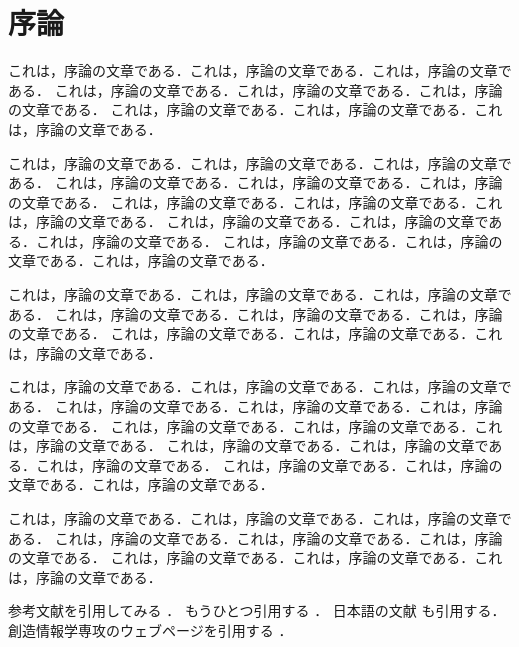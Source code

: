 \chapter{序論}

これは，序論の文章である．これは，序論の文章である．これは，序論の文章である．
これは，序論の文章である．これは，序論の文章である．これは，序論の文章である．
これは，序論の文章である．これは，序論の文章である．これは，序論の文章である．

これは，序論の文章である．これは，序論の文章である．これは，序論の文章である．
これは，序論の文章である．これは，序論の文章である．これは，序論の文章である．
これは，序論の文章である．これは，序論の文章である．これは，序論の文章である．
これは，序論の文章である．これは，序論の文章である．これは，序論の文章である．
これは，序論の文章である．これは，序論の文章である．これは，序論の文章である．

これは，序論の文章である．これは，序論の文章である．これは，序論の文章である．
これは，序論の文章である．これは，序論の文章である．これは，序論の文章である．
これは，序論の文章である．これは，序論の文章である．これは，序論の文章である．

これは，序論の文章である．これは，序論の文章である．これは，序論の文章である．
これは，序論の文章である．これは，序論の文章である．これは，序論の文章である．
これは，序論の文章である．これは，序論の文章である．これは，序論の文章である．
これは，序論の文章である．これは，序論の文章である．これは，序論の文章である．
これは，序論の文章である．これは，序論の文章である．これは，序論の文章である．

これは，序論の文章である．これは，序論の文章である．これは，序論の文章である．
これは，序論の文章である．これは，序論の文章である．これは，序論の文章である．
これは，序論の文章である．これは，序論の文章である．これは，序論の文章である．

参考文献を引用してみる \cite{92795,Knuth86}．
もうひとつ引用する \cite{BollenHHJ07}．
日本語の文献 \cite{Okumura07,ON06} も引用する．
創造情報学専攻のウェブページを引用する \cite{CI08}．
